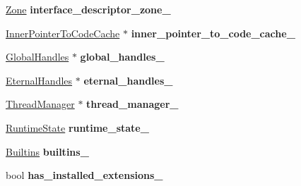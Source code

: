 \begin{DoxyCompactItemize}
\item 
\hyperlink{classv8_1_1internal_1_1_zone}{Zone} {\bfseries interface\+\_\+descriptor\+\_\+zone\+\_\+}\hypertarget{classv8_1_1internal_1_1_isolate_a055b4d31f52621eb8e62904a333ca1d1}{}\label{classv8_1_1internal_1_1_isolate_a055b4d31f52621eb8e62904a333ca1d1}

\item 
\hyperlink{classv8_1_1internal_1_1_inner_pointer_to_code_cache}{Inner\+Pointer\+To\+Code\+Cache} $\ast$ {\bfseries inner\+\_\+pointer\+\_\+to\+\_\+code\+\_\+cache\+\_\+}\hypertarget{classv8_1_1internal_1_1_isolate_a5db32536729703844786035b67b4eecd}{}\label{classv8_1_1internal_1_1_isolate_a5db32536729703844786035b67b4eecd}

\item 
\hyperlink{classv8_1_1internal_1_1_global_handles}{Global\+Handles} $\ast$ {\bfseries global\+\_\+handles\+\_\+}\hypertarget{classv8_1_1internal_1_1_isolate_a8d18591df1fafc60de98cbd5c88adcda}{}\label{classv8_1_1internal_1_1_isolate_a8d18591df1fafc60de98cbd5c88adcda}

\item 
\hyperlink{classv8_1_1internal_1_1_eternal_handles}{Eternal\+Handles} $\ast$ {\bfseries eternal\+\_\+handles\+\_\+}\hypertarget{classv8_1_1internal_1_1_isolate_afb09fb4a9b494136719c3648f3c3d836}{}\label{classv8_1_1internal_1_1_isolate_afb09fb4a9b494136719c3648f3c3d836}

\item 
\hyperlink{classv8_1_1internal_1_1_thread_manager}{Thread\+Manager} $\ast$ {\bfseries thread\+\_\+manager\+\_\+}\hypertarget{classv8_1_1internal_1_1_isolate_a7b4e92fae71864d47edcdf19f2363ba4}{}\label{classv8_1_1internal_1_1_isolate_a7b4e92fae71864d47edcdf19f2363ba4}

\item 
\hyperlink{classv8_1_1internal_1_1_runtime_state}{Runtime\+State} {\bfseries runtime\+\_\+state\+\_\+}\hypertarget{classv8_1_1internal_1_1_isolate_afc88b0626a59309c808b1a273329fd5e}{}\label{classv8_1_1internal_1_1_isolate_afc88b0626a59309c808b1a273329fd5e}

\item 
\hyperlink{classv8_1_1internal_1_1_builtins}{Builtins} {\bfseries builtins\+\_\+}\hypertarget{classv8_1_1internal_1_1_isolate_a928707766b16f37609bc6a66622f0853}{}\label{classv8_1_1internal_1_1_isolate_a928707766b16f37609bc6a66622f0853}

\item 
bool {\bfseries has\+\_\+installed\+\_\+extensions\+\_\+}\hypertarget{classv8_1_1internal_1_1_isolate_a1e6cc5dfc25a7dfa4c7b88a4b7a658c7}{}\label{classv8_1_1internal_1_1_isolate_a1e6cc5dfc25a7dfa4c7b88a4b7a658c7}


\end{DoxyCompactItemize}
